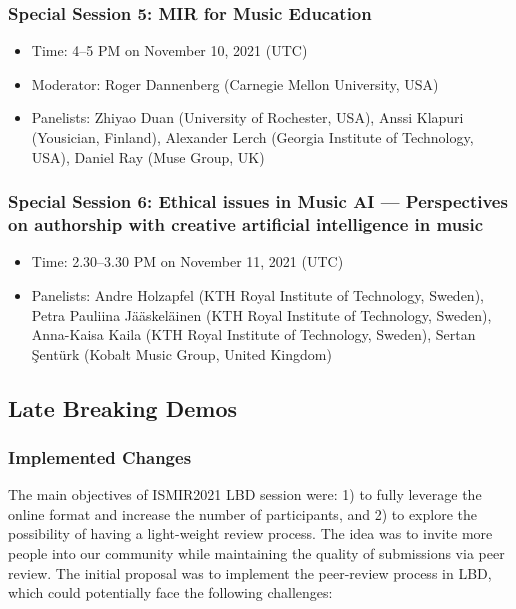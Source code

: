 \documentclass[%
10pt,								%
titlepage,						%
]
{scrartcl}
\begin{document}
        \subsubsection{Special Session 5: MIR for Music Education}
        \begin{itemize}
            \item   Time: 4--5 PM on November 10, 2021 (UTC)
            \item   Moderator: Roger Dannenberg (Carnegie Mellon University, USA)
            \item   Panelists: Zhiyao Duan (University of Rochester, USA), Anssi Klapuri (Yousician, Finland), Alexander Lerch (Georgia Institute of Technology, USA), Daniel Ray (Muse Group, UK)

        \end{itemize}

        \subsubsection[Special Session 6: Ethical issues in Music AI]{Special Session 6: Ethical issues in Music AI --- Perspectives on authorship with creative artificial intelligence in music}
        \begin{itemize}
            \item   Time: 2.30--3.30 PM on November 11, 2021 (UTC)
            \item   Panelists: Andre Holzapfel (KTH Royal Institute of Technology, Sweden), Petra Pauliina J\"a\"askel\"ainen (KTH Royal Institute of Technology, Sweden), Anna-Kaisa Kaila (KTH Royal Institute of Technology, Sweden), Sertan \c{S}ent\"urk (Kobalt Music Group, United Kingdom) 
        \end{itemize}

    \subsection{Late Breaking Demos}
        \subsubsection{Implemented Changes}
            The main objectives of ISMIR2021 LBD session were: 1) to fully leverage the online format and increase the number of participants, and 2) to explore the possibility of having a light-weight review process. The idea was to invite more people into our community while maintaining the quality of submissions via peer review. The initial proposal was to implement the peer-review process in LBD, which could potentially face the following challenges:
\end{document}
